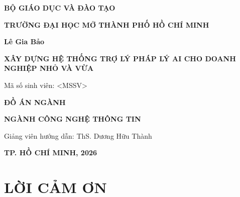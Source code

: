 \documentclass[12pt,a4paper]{report}
\numberwithin{equation}{chapter}
\numberwithin{figure}{chapter}
\numberwithin{table}{chapter}
\newcommand{\tenSV}{Lê Gia Bảo}
\newcommand{\maSV}{<MSSV>}
\newcommand{\tenDoAn}{XÂY DỰNG HỆ THỐNG TRỢ LÝ PHÁP LÝ AI CHO DOANH NGHIỆP NHỎ VÀ VỪA}
\newcommand{\tenNganh}{CÔNG NGHỆ THÔNG TIN}
\newcommand{\namBaoCao}{2026}
\newcommand{\gvhd}{ThS. Dương Hữu Thành}
\begin{document}
\begin{titlepage}
\centering

{\bfseries BỘ GIÁO DỤC VÀ ĐÀO TẠO\par}
\vspace{0.3cm}
{\bfseries TRƯỜNG ĐẠI HỌC MỞ THÀNH PHỐ HỒ CHÍ MINH\par}

\vspace{2.2cm}

{\large\bfseries \tenSV\par}

\vspace{0.5cm}

{\Large\bfseries \tenDoAn\par}

\vspace{0.8cm}

{\large Mã số sinh viên: \maSV\par}

\vspace{1.2cm}

{\huge\bfseries ĐỒ ÁN NGÀNH\par}

\vspace{0.8cm}

{\large\bfseries NGÀNH \tenNganh\par}

\vspace{1.2cm}

{\large Giảng viên hướng dẫn: \gvhd\par}

\vfill

{\bfseries TP. HỒ CHÍ MINH, \namBaoCao\par}

\end{titlepage}

\clearpage

\setcounter{page}{1}
\pagestyle{plain}

\chapter*{LỜI CẢM ƠN}
\end{document}

